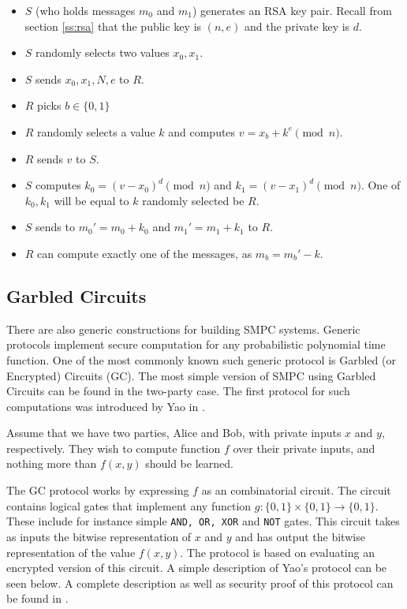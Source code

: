 \begin{itemize}
  \item $S$ (who holds messages $m_0$ and $m_1$) generates an RSA key pair. Recall from section \ref{ss:rsa} that the public key is $(n,e)$ and the private key is $d$.
  \item $S$ randomly selects two values $x_0, x_1$.
  \item $S$ sends $x_0, x_1, N, e$ to $R$.
  \item $R$ picks $b \in \{0,1\}$
  \item $R$ randomly selects a value $k$ and computes $v = x_b + k^e \pmod{n}$.
  \item $R$ sends $v$ to $S$.
  \item $S$ computes $k_0 = (v-x_0)^d \pmod{n}$ and $k_1 = (v-x_1)^d \pmod{n}$. One of $k_0, k_1$ will be equal to $k$ randomly selected be $R$.
  \item $S$ sends to $m_0' = m_0 + k_0$ and $m_1' = m_1 + k_1$ to $R$.
  \item $R$ can compute exactly one of the messages, as $m_b = m_b' - k$.
\end{itemize}

\subsection{Garbled Circuits}
There are also generic constructions for building SMPC systems.
Generic protocols implement secure computation for any probabilistic polynomial time function.
One of the most commonly known such generic protocol is Garbled (or Encrypted) Circuits (GC).
The most simple version of SMPC using Garbled Circuits can be found in the two-party case.
The first protocol for such computations was introduced by Yao in \cite{yao1986generate}.

Assume that we have two parties, Alice and Bob, with private inputs $x$ and $y$, respectively.
They wish to compute function $f$ over their private inputs, and nothing more than $f(x,y)$ should be learned.

The GC protocol works by expressing $f$ as an combinatorial circuit.
The circuit contains logical gates that implement any function $g : \{0,1\} \times \{0,1\} \rightarrow \{0,1\}$.
These include for instance simple \texttt{AND, OR, XOR} and \texttt{NOT} gates.
This circuit takes as inputs the bitwise representation of $x$ and $y$ and has output the bitwise representation of the value $f(x,y)$.
The protocol is based on evaluating an encrypted version of this circuit.
A simple description of Yao's protocol can be seen below. A complete description as well as security proof of this protocol can be found in \cite{lindell2009proof}.

